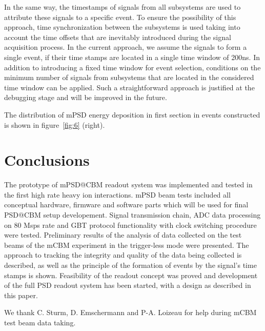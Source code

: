 \documentclass[a4paper,11pt]{article}
\begin{document}
In the same way, the timestamps of signals from all subsystems are used to attribute these signals to a specific event. To ensure the possibility of this approach, time synchronization between the subsystems is used taking into account the time offsets that are inevitably introduced during the signal acquisition process. In the current approach, we assume the signals to form a single event, if their time stamps are located in a single time window of 200ns. In addition to introducing a fixed time window for event selection, conditions on the minimum number of signals from subsystems that are located in the considered time window can be applied. Such a straightforward approach is justified at the debugging stage and will be improved in the future.

The distribution of mPSD energy deposition in first section in events constructed is shown in figure~\ref{fig:6} (right).



\section{Conclusions}
The prototype of mPSD@CBM readout system was implemented and tested in the first high rate heavy ion interactions. mPSD beam tests included all conceptual hardware, firmware and software parts which will be used for final PSD@CBM setup developement. Signal transmission chain, ADC data processing on 80 Msps rate and GBT protocol functionality with clock switching procedure were tested. Preliminary results of the analysis of data collected on the test beams of the mCBM experiment in the trigger-less mode were presented. The approach to tracking the integrity and quality of the data being collected is described, as well as the principle of the formation of events by the signal's time stamps is shown.
Feasibility of the readout concept was proved and development of the full PSD readout system has been started, with a design as described in this paper.

\acknowledgments
We thank C. Sturm, D. Emschermann and P-A. Loizeau for help during mCBM test beam data taking.
\end{document}
